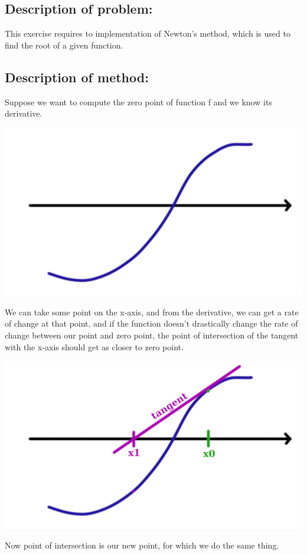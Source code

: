 \documentclass{article}
\begin{document}
\subsection*{Description of problem:}
This exercise requires to implementation of Newton's method, which is used to find the root of a given function.

\subsection*{Description of method:}
Suppose we want to compute the zero point of function f and we know its derivative. 


\begin{center}
    \includegraphics[scale=0.3]{newton1}
\end{center}
We can take some point on the x-axis, and from the derivative, we can get a rate of change at that point, and if the function doesn't drastically change the rate of change between our point and zero point, the point of intersection of the tangent with the x-axis should get as closer to zero point.

\begin{center}
    \includegraphics[scale=0.3]{newton2}
\end{center}
Now point of intersection is our new point, for which we do the same thing.
\end{document}
